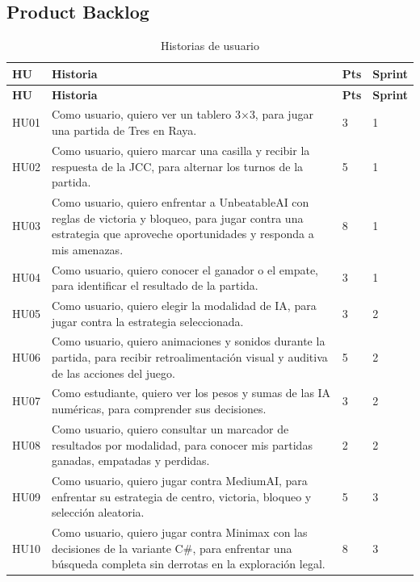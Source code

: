 \documentclass[12pt,a4paper]{article}
\begin{document}
\subsection{Product Backlog}
\begin{longtable}{p{1.1cm}p{8.6cm}p{1.2cm}p{1.6cm}}
\caption{Historias de usuario}\\
\toprule
\textbf{HU} & \textbf{Historia} & \textbf{Pts} & \textbf{Sprint}\\
\midrule\endfirsthead
\toprule
\textbf{HU} & \textbf{Historia} & \textbf{Pts} & \textbf{Sprint}\\
\midrule\endhead
HU01 & Como usuario, quiero ver un tablero 3$\times$3, para jugar una partida de Tres en Raya. & 3 & 1\\
HU02 & Como usuario, quiero marcar una casilla y recibir la respuesta de la JCC, para alternar los turnos de la partida. & 5 & 1\\
HU03 & Como usuario, quiero enfrentar a UnbeatableAI con reglas de victoria y bloqueo, para jugar contra una estrategia que aproveche oportunidades y responda a mis amenazas. & 8 & 1\\
HU04 & Como usuario, quiero conocer el ganador o el empate, para identificar el resultado de la partida. & 3 & 1\\
HU05 & Como usuario, quiero elegir la modalidad de IA, para jugar contra la estrategia seleccionada. & 3 & 2\\
HU06 & Como usuario, quiero animaciones y sonidos durante la partida, para recibir retroalimentación visual y auditiva de las acciones del juego. & 5 & 2\\
HU07 & Como estudiante, quiero ver los pesos y sumas de las IA numéricas, para comprender sus decisiones. & 3 & 2\\
HU08 & Como usuario, quiero consultar un marcador de resultados por modalidad, para conocer mis partidas ganadas, empatadas y perdidas. & 2 & 2\\
HU09 & Como usuario, quiero jugar contra MediumAI, para enfrentar su estrategia de centro, victoria, bloqueo y selección aleatoria. & 5 & 3\\
HU10 & Como usuario, quiero jugar contra Minimax con las decisiones de la variante C\#, para enfrentar una búsqueda completa sin derrotas en la exploración legal. & 8 & 3\\
\bottomrule
\end{longtable}
\end{document}
